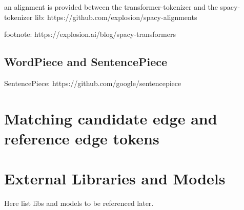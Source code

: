 \documentclass[11pt]{scrreprt}
\begin{document}
an alignment is provided between the transformer-tokenizer and the spacy-tokenizer
lib: https://github.com/explosion/spacy-alignments

footnote: https://explosion.ai/blog/spacy-transformers


\subsection{WordPiece and SentencePiece}

SentencePiece: https://github.com/google/sentencepiece



\section{Matching candidate edge and reference edge tokens}
%
%


\section{External Libraries and Models}
Here list libs and models to be referenced later.
\end{document}
